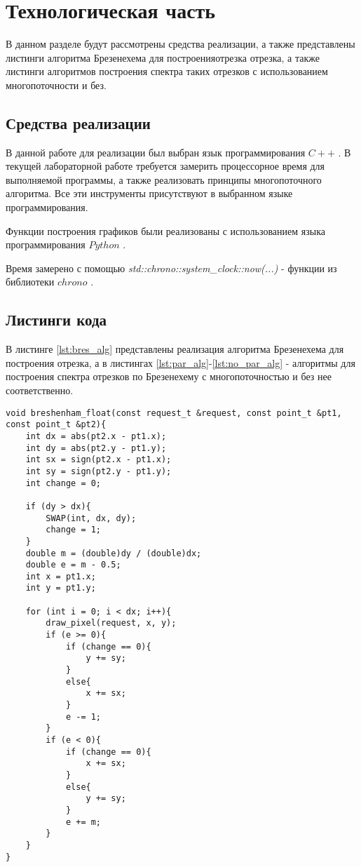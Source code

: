 \chapter{Технологическая часть}

В данном разделе будут рассмотрены средства реализации, а также представлены листинги алгоритма Брезенехема для построенияотрезка отрезка, а также листинги алгоритмов построения спектра таких отрезков с использованием многопоточности и без.

\section{Средства реализации}
В данной работе для реализации был выбран язык программирования $C++$ \cite{cpp-lang}. В текущей лабораторной работе требуется замерить процессорное время для выполняемой программы, а также реализовать принципы многопоточного алгоритма. Все эти инструменты присутствуют в выбранном языке программирования. 

Функции построения графиков были реализованы с использованием языка программирования $Python$ \cite{python-lang}.

Время замерено с помощью \textit{std::chrono::system\_clock::now(...)} - функции из библиотеки $chrono$ \cite{cpp-lang-chrono}.


\section{Листинги кода}

В листинге \ref{lst:bres_alg} представлены реализация алгоритма Брезенехема для построения отрезка, а в листингах \ref{lst:par_alg}-\ref{lst:no_par_alg} - алгоритмы для построения спектра отрезков по Брезенехему с многопоточностью и без нее соответственно.

\clearpage

\begin{center}
    \captionsetup{justification=raggedright,singlelinecheck=off}
    \begin{lstlisting}[label=lst:bres_alg,caption=Алгоритм Брезенехема для построения отрезка]
void breshenham_float(const request_t &request, const point_t &pt1, const point_t &pt2){
	int dx = abs(pt2.x - pt1.x);
	int dy = abs(pt2.y - pt1.y);
	int sx = sign(pt2.x - pt1.x);
	int sy = sign(pt2.y - pt1.y);
	int change = 0;

	if (dy > dx){
		SWAP(int, dx, dy);
		change = 1;
	}
	double m = (double)dy / (double)dx;
	double e = m - 0.5;
	int x = pt1.x;
	int y = pt1.y;

	for (int i = 0; i < dx; i++){
		draw_pixel(request, x, y);
		if (e >= 0){
			if (change == 0){
				y += sy;
			}
			else{
				x += sx;
			}
			e -= 1;
		}
		if (e < 0){
			if (change == 0){
				x += sx;
			}
			else{
				y += sy;
			}
			e += m;
		}
	}
}
\end{lstlisting}
\end{center}


